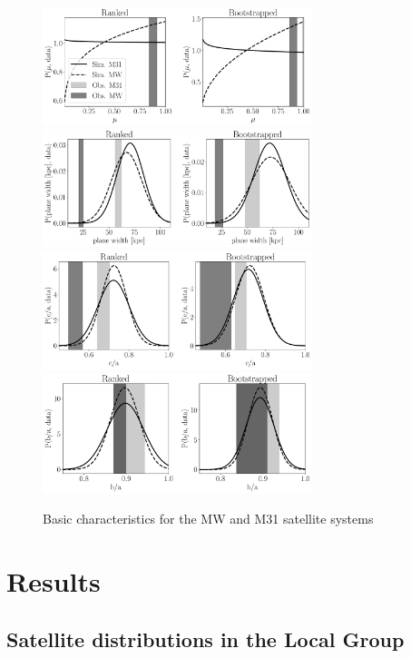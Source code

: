 \documentclass[a4paper,fleqn,usenatbib]{mnras}
\begin{document}
\begin{figure}
\centering
\includegraphics[width=0.7\textwidth]{distribution_mu.pdf}
\includegraphics[width=0.7\textwidth]{distribution_width.pdf}
\includegraphics[width=0.7\textwidth]{distribution_ca_ratio.pdf}
\includegraphics[width=0.7\textwidth]{distribution_ba_ratio.pdf}
\caption{Basic characteristics for the MW and M31 satellite systems
\label{fig:general}}
\end{figure}



\section{Results}
\label{sec:results}


\subsection{Satellite distributions in the Local Group}
\end{document}
